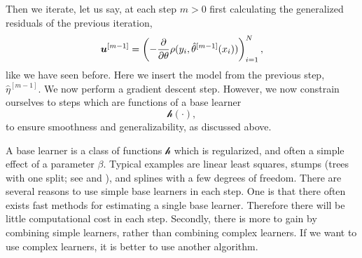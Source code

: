 Then we iterate, let us say, at each step $m>0$ first calculating the generalized residuals of the previous iteration,
\begin{equation*}
    \bm{u}^{[m-1]}=\left(-\frac{\partial}{\partial \theta}\rho(y_i, \hat{\theta}^{[m-1]}(x_i))\right)_{i=1}^N,
\end{equation*}
like we have seen before.
Here we insert the model from the previous step, $\hat{\eta}^{[m-1]}$.
We now perform a gradient descent step.
However, we now constrain ourselves to steps which are functions of a base learner
\begin{equation*}
    \mathcal{h}(\cdot),
\end{equation*}
to ensure smoothness and generalizability, as discussed above.

A base learner is a class of functions $\mathcal{h}$ which is regularized, and often a simple effect of a parameter $\beta$.
Typical examples are linear least squares, stumps (trees with one split; see \citet{buhlmann2007} and \citet{ESL}), and splines with a few degrees of freedom.
There are several reasons to use simple base learners in each step.
One is that there often exists fast methods for estimating a single base learner.
Therefore there will be little computational cost in each step. 
Secondly, there is more to gain by combining simple learners, rather than combining complex learners.
If we want to use complex learners, it is better to use another algorithm.

